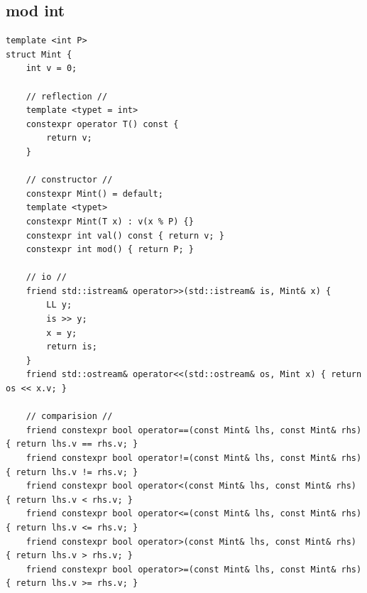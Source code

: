 \documentclass[UTF8, a4paper, titlepage, twoside]{ctexart}
\begin{document}
\subsection { mod int }
\begin{lstlisting}[style=cpp]
template <int P>
struct Mint {
    int v = 0;

    // reflection //
    template <typet = int>
    constexpr operator T() const {
        return v;
    }

    // constructor //
    constexpr Mint() = default;
    template <typet>
    constexpr Mint(T x) : v(x % P) {}
    constexpr int val() const { return v; }
    constexpr int mod() { return P; }

    // io //
    friend std::istream& operator>>(std::istream& is, Mint& x) {
        LL y;
        is >> y;
        x = y;
        return is;
    }
    friend std::ostream& operator<<(std::ostream& os, Mint x) { return os << x.v; }

    // comparision //
    friend constexpr bool operator==(const Mint& lhs, const Mint& rhs) { return lhs.v == rhs.v; }
    friend constexpr bool operator!=(const Mint& lhs, const Mint& rhs) { return lhs.v != rhs.v; }
    friend constexpr bool operator<(const Mint& lhs, const Mint& rhs) { return lhs.v < rhs.v; }
    friend constexpr bool operator<=(const Mint& lhs, const Mint& rhs) { return lhs.v <= rhs.v; }
    friend constexpr bool operator>(const Mint& lhs, const Mint& rhs) { return lhs.v > rhs.v; }
    friend constexpr bool operator>=(const Mint& lhs, const Mint& rhs) { return lhs.v >= rhs.v; }


\end{lstlisting}
\end{document}
